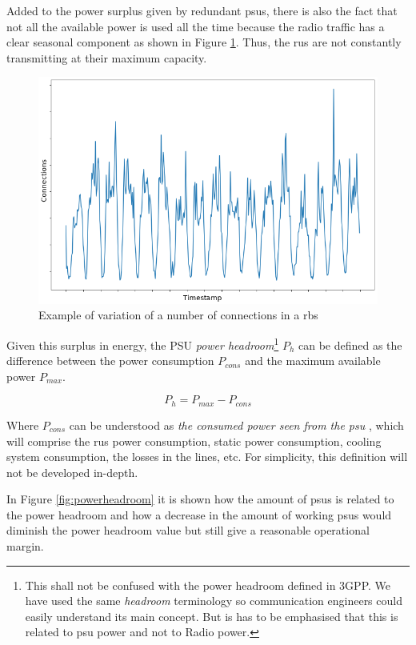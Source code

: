 Added to the power surplus given by redundant \acp{psu}, there is also the fact that not all the available power is used all the time because the radio traffic has a clear seasonal component as shown in Figure \ref{fig:connectionstwoweeks}. Thus, the \acp{ru} are not constantly transmitting at their maximum capacity.


\begin{figure}[H]
	\centering
	\includegraphics[width=0.8\linewidth]{figures/connections_two_weeks}
	\caption{Example of variation of a number of connections in a \ac{rbs}}
	\label{fig:connectionstwoweeks}
\end{figure}

Given this surplus in energy, the PSU \emph{power headroom}\footnote{This shall not be confused with the power headroom defined in 3GPP. We have used the same \emph{headroom} terminology so communication engineers could easily understand its main concept. But is has to be emphasised that this is related to \ac{psu} power and not to Radio power.} $P_h$ can be defined as the difference between the power consumption $P_{cons}$ and the maximum available power $P_{max}$.

\begin{equation}\label{eq:phdroom}
	P_h = P_{max} - P_{cons}
\end{equation}

Where $P_{cons}$ can be understood as \emph{the consumed power seen from the \ac{psu}} \cite{muhammad2010uplink,procedures20123gpp}, which will comprise the \acp{ru} power consumption, static power consumption, cooling system consumption, the losses in the lines, etc. For simplicity, this definition will not be developed in-depth.

In Figure \ref{fig:powerheadroom} it is shown how the amount of \acp{psu} is related to the power headroom and how a decrease in the amount of working \acp{psu} would diminish the power headroom value but still give a reasonable operational margin.   

